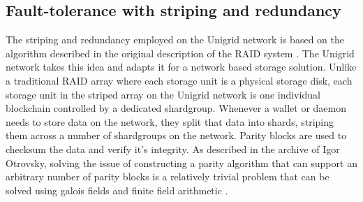 \documentclass[10pt,a4paper,final]{article}
\begin{document}
\subsection{Fault-tolerance with striping and redundancy}
The striping and redundancy employed on the Unigrid network is based on the algorithm described in the original description of the RAID system \cite{patterson1988, chen1990}. The Unigrid network takes this idea and adapts it for a network based storage solution. Unlike a traditional RAID array where each storage unit is a physical storage disk, each storage unit in the striped array on the Unigrid network is one individual blockchain controlled by a dedicated \gls{shardgroup}. Whenever a wallet or daemon needs to store data on the network, they split that data into shards, striping them across a number of \glspl{shardgroup} on the network. Parity blocks are used to checksum the data and verify it's integrity. As described in the archive of Igor Otrovsky, solving the issue of constructing a parity algorithm that can support an arbitrary number of parity blocks is a relatively trivial problem that can be solved using galois fields and finite field arithmetic \cite{igorparity2014} \cite{finitefield2021}.
\end{document}
